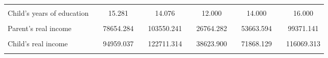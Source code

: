 \begin{tabular}{rrrrrrrrrrr}
          &           &           &           &           &           &           &           &           &           &  \\
\multicolumn{1}{l}{Child's years of education} &           & \multicolumn{1}{c}{15.281} &           & \multicolumn{1}{c}{14.076} &           & \multicolumn{1}{c}{12.000} &           & \multicolumn{1}{c}{14.000} &           & \multicolumn{1}{c}{16.000} \\
          &           &           &           &           &           &           &           &           &           &  \\
\multicolumn{1}{l}{Parent's real income} &           & \multicolumn{1}{c}{78654.284} &           & \multicolumn{1}{c}{103550.241} &           & \multicolumn{1}{c}{26764.282} &           & \multicolumn{1}{c}{53663.594} &           & \multicolumn{1}{c}{99371.141} \\
          &           &           &           &           &           &           &           &           &           &  \\
\multicolumn{1}{l}{Child's real income} &           & \multicolumn{1}{c}{94959.037} &           & \multicolumn{1}{c}{122711.314} &           & \multicolumn{1}{c}{38623.900} &           & \multicolumn{1}{c}{71868.129} &           & \multicolumn{1}{c}{116069.313} \\
\midrule
          &           &           &           &           &           &           &           &           &           &  \\
\bottomrule
\end{tabular}%
